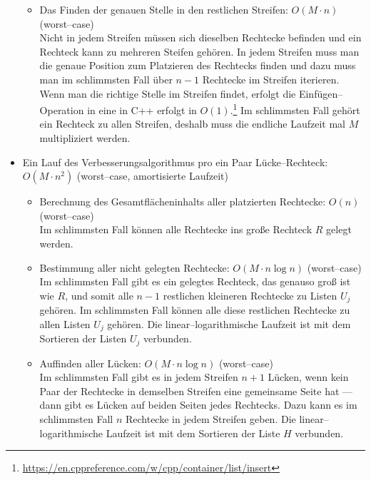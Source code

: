 \begin{itemize}
\begin{itemize}
		\item Das Finden der genauen Stelle in den restlichen Streifen: $O(M \cdot n)$ (worst--case)\\
		Nicht in jedem Streifen müssen sich dieselben Rechtecke befinden und ein Rechteck 
		kann zu mehreren Steifen gehören.
		In jedem Streifen muss man die genaue Position zum Platzieren des Rechtecks finden
		und dazu muss man im schlimmsten Fall über $n-1$ Rechtecke im Streifen iterieren.
		Wenn man die richtige Stelle im Streifen findet, erfolgt die
		Einfügen--Operation in eine  in C++ erfolgt in $O(1)$.\footnote{\href{https://en.cppreference.com/w/cpp/container/list/insert}{https://en.cppreference.com/w/cpp/container/list/insert}}
		Im schlimmsten Fall gehört ein Rechteck zu allen Streifen, deshalb muss die endliche Laufzeit
		mal $M$ multipliziert werden.


	\end{itemize}

	\item Ein Lauf des Verbesserungsalgorithmus pro ein Paar Lücke--Rechteck: $O(M \cdot n^2)$ (worst--case, amortisierte Laufzeit)

	\begin{itemize}
		\item Berechnung des Gesamtflächeninhalts aller platzierten Rechtecke: $O(n)$ (worst--case)\\
		Im schlimmsten Fall können alle Rechtecke ins große Rechteck $R$ gelegt werden.

		\item Bestimmung aller nicht gelegten Rechtecke: $O(M \cdot n \log n)$ (worst--case)\\
		Im schlimmsten Fall gibt es ein gelegtes Rechteck, das genauso groß ist wie $R$, und somit
		alle $n-1$ restlichen kleineren Rechtecke zu Listen $U_j$ gehören. 
		Im schlimmsten Fall können alle diese restlichen Rechtecke zu allen Listen $U_j$ gehören.
		Die linear--logarithmische Laufzeit ist mit dem Sortieren der Listen $U_j$ verbunden.

		\item Auffinden aller Lücken: $O(M \cdot n \log n)$ (worst--case)\\
		Im schlimmsten Fall gibt es in jedem Streifen $n+1$ Lücken, wenn kein Paar
		der Rechtecke in demselben Streifen eine gemeinsame Seite hat ---
		dann gibt es Lücken auf beiden Seiten
		jedes Rechtecks. Dazu kann es im schlimmsten Fall $n$ Rechtecke in jedem Streifen geben.
		Die linear--logarithmische Laufzeit ist mit dem Sortieren der Liste $H$ verbunden.


\end{itemize}
\end{itemize}
